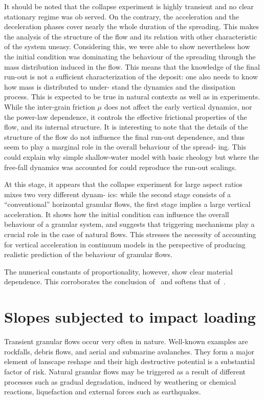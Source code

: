 It should be noted that the collapse experiment is
highly transient and no clear stationary regime was ob
served. On the contrary, the acceleration and the deceleration 
phases cover 
nearly the whole duration of the
spreading. This makes the analysis of the structure of
the flow and its relation with other characteristic of the
system uneasy.
Considering this, we were able to show nevertheless
how the initial condition was dominating the behaviour
of the spreading through the mass distribution induced
in the flow. This means that the knowledge of the final
run-out is not a sufficient characterization of the deposit:
one also needs to know how mass is distributed to under-
stand the dynamics and the dissipation process. This is
expected to be true in natural contexts as well as in
experiments.
While the inter-grain friction
$\mu$
does not affect the early vertical dynamics, nor the power-law dependence,
it controls the effective frictional properties of the flow,
and its internal structure. It is interesting to note that
the details of the structure of the flow do not influence
the final run-out dependence, and thus seem to play a
marginal role in the overall behaviour of the spread-
ing. This could explain why simple shallow-water model
with basic rheology but where the free-fall dynamics was
accounted for could reproduce the run-out scalings.

At this stage, it appears that the collapse experiment
for large aspect ratios mixes two very different dynam-
ics: while the second stage consists of a ``conventional''
horizontal granular flows, the first stage implies a large
vertical acceleration. It shows how the initial condition
can influence the overall behaviour of a granular
system, and suggests that triggering mechanisms play a
crucial role in the case of natural flows. This stresses
the necessity of accounting for vertical acceleration in
continuum models in the perspective of producing realistic prediction of the 
behaviour of granular flows.

The numerical constants of proportionality, however, show clear material 
dependence. This corroborates the conclusion 
of~\citet{Lajeunesse2004,Balmforth2005} and 
softens that of~\citet{Lube2005}.


\section{Slopes subjected to impact loading}


Transient granular flows occur very often in nature. 
Well-known examples are rockfalls, debris flows, 
and aerial and submarine avalanches. They form a major element of 
lanscape reshape and their high destructive potential is a 
substantial factor of risk. Natural granular flows may be triggered 
as a result of different processes such as gradual degradation,   
induced by weathering or chemical reactions, liquefaction    
and external forces such as earthquakes.          

